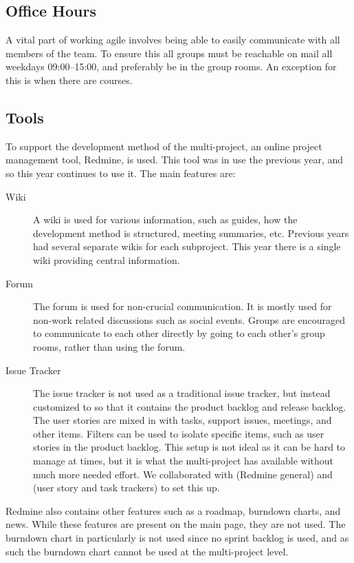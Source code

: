 \subsection{Office Hours}
A vital part of working agile involves being able to easily communicate with all members of the team. To ensure this all groups must be reachable on mail all weekdays 09:00--15:00, and preferably be in the group rooms. An exception for this is when there are courses.

\subsection{Tools}\label{sec:tools}
To support the development method of the multi-project, an online project management tool, Redmine, is used. This tool was in use the previous year, and so this year continues to use it. The main features are:

\begin{description}
  \item[Wiki] A wiki is used for various information, such as guides, how the development method is structured, meeting summaries, etc. Previous years had several separate wikis for each subproject. This year there is a single wiki providing central information.
  \item[Forum] The forum is used for non-crucial communication. It is mostly used for non-work related discussions such as social events. Groups are encouraged to communicate to each other directly by going to each other's group rooms, rather than using the forum.
  \item[Issue Tracker] The issue tracker is not used as a traditional issue tracker, but instead customized to so that it contains the product backlog and release backlog. The user stories are mixed in with tasks, support issues, meetings, and other items. Filters can be used to isolate specific items, such as user stories in the product backlog. This setup is not ideal as it can be hard to manage at times, but it is what the multi-project has available without much more needed effort. We collaborated with  (Redmine general) and  (user story and task trackers) to set this up.
\end{description}

Redmine also contains other features such as a roadmap, burndown charts, and news. While these features are present on the main page, they are not used. The burndown chart in particularly is not used since no sprint backlog is used, and as such the burndown chart cannot be used at the multi-project level.

